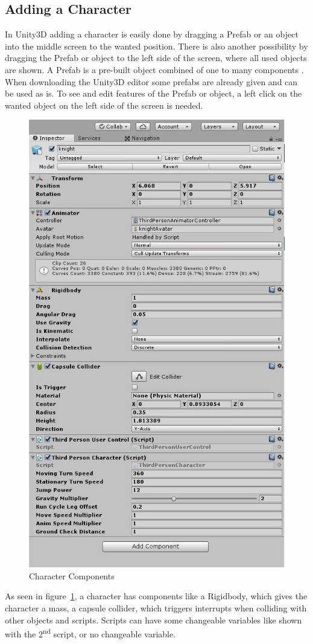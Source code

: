 \documentclass[conference]{IEEEtran}
\begin{document}
\subsection{Adding a Character}

In Unity3D adding a character is easily done by dragging a Prefab or an object into the middle screen to the wanted position. There is also another possibility by dragging the Prefab or object to the left side of the screen, where all used objects are shown. A Prefab is a pre-built object combined of one to many components \cite{b2}. When downloading the Unity3D editor some prefabs are already given and can be used as is.
To see and edit features of the Prefab or object, a left click on the wanted object on the left side of the screen is needed. 

\begin{figure}[htbp]
  \includegraphics[width=.4\textwidth]{pictures/character_controls_character_components}
  \caption{Character Components}
  \label{fig:character_controls_character_components}
\end{figure}

As seen in figure~\ref{fig:character_controls_character_components}, a character has components like a Rigidbody, which gives the character a mass, a capsule collider, which triggers interrupts when colliding with other objects and scripts. Scripts can have some changeable variables like shown with the 2\textsuperscript{nd} script, or no changeable variable.

\lstset{
basicstyle=\ttfamily\small,
numbers=left,
breaklines=true,
numberstyle=\tiny,
numbersep=5pt,
tabsize=3
}
\end{document}
